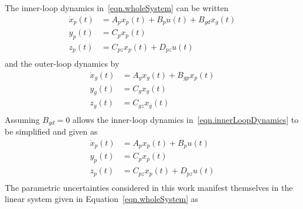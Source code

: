 The inner-loop dynamics in\ \eqref{eqn.wholeSystem} can be written
\begin{equation}
  \label{eqn.innerLoopDynamics}
  \begin{split}
    \dot{x}_{p}(t) &= A_{p}x_{p}(t) + B_{p}u(t) + B_{gd}x_{g}(t) \\
    y_{p}(t) &= C_{p}x_{p}(t) \\
    z_{p}(t) &= C_{pz}x_{p}(t) + D_{pz}u(t) \\
  \end{split}
\end{equation}
and the outer-loop dynamics by
\begin{equation}
  \label{eqn.outerLoopDynamics}
  \begin{split}
    \dot{x}_{g}(t) &= A_{g}x_{g}(t) + B_{gp}x_{p}(t) \\
    y_{g}(t) &= C_{g}x_{g}(t) \\
    z_{g}(t) &= C_{gz}x_{g}(t) \\
  \end{split}
\end{equation}
Assuming $B_{gd}=0$ allows the inner-loop dynamics in\ \eqref{eqn.innerLoopDynamics} to be simplified and given as
\begin{equation}
  \label{eqn.plantxp}
  \begin{split}
    \dot{x}_{p}(t) &= A_{p}x_{p}(t) + B_{p}u(t) \\
    y_{p}(t) &= C_{p}x_{p}(t) \\
    z_{p}(t) &= C_{pz}x_{p}(t) + D_{pz}u(t) \\
  \end{split}
\end{equation}
The parametric uncertainties considered in this work manifest themselves in the linear system given in Equation\ \eqref{eqn.wholeSystem} as
